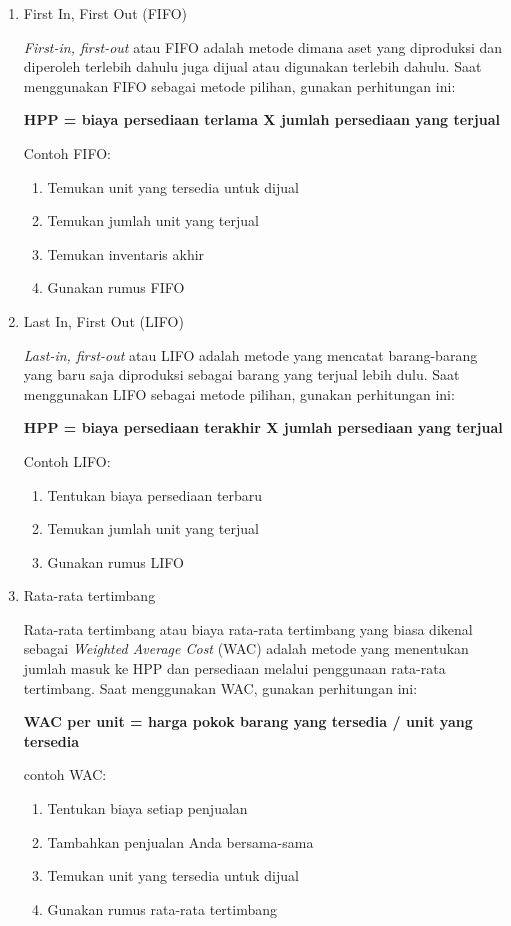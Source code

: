 \begin{enumerate}
	\item First In, First Out (FIFO)
	
	\textit{First-in, first-out} atau FIFO adalah metode dimana aset yang diproduksi dan diperoleh terlebih dahulu juga dijual atau digunakan terlebih dahulu. Saat menggunakan FIFO sebagai metode pilihan, gunakan perhitungan ini:
	
	
	\textbf{HPP = biaya persediaan terlama X jumlah persediaan yang terjual}

	Contoh FIFO:
	\begin{enumerate}
		\item Temukan unit yang tersedia untuk dijual
		\item Temukan jumlah unit yang terjual
		\item Temukan inventaris akhir
		\item Gunakan rumus FIFO
	\end{enumerate}

	\item Last In, First Out (LIFO)
	
	\textit{Last-in, first-out} atau LIFO adalah metode yang mencatat barang-barang yang baru saja diproduksi sebagai barang yang terjual lebih dulu. Saat menggunakan LIFO sebagai metode pilihan, gunakan perhitungan ini:


	\textbf{HPP = biaya persediaan terakhir X jumlah persediaan yang terjual}

	Contoh LIFO:
	\begin{enumerate}
		\item Tentukan biaya persediaan terbaru
		\item Temukan jumlah unit yang terjual
		\item Gunakan rumus LIFO
	\end{enumerate}

	\item Rata-rata tertimbang
	
	Rata-rata tertimbang atau biaya rata-rata tertimbang yang biasa dikenal sebagai \textit{Weighted Average Cost} (WAC) adalah metode yang menentukan jumlah masuk ke HPP dan persediaan melalui penggunaan rata-rata tertimbang. Saat menggunakan WAC, gunakan perhitungan ini:


	\textbf{WAC per unit = harga pokok barang yang tersedia / unit yang tersedia}

	contoh WAC:
	\begin{enumerate}
		\item Tentukan biaya setiap penjualan
		\item Tambahkan penjualan Anda bersama-sama
		\item Temukan unit yang tersedia untuk dijual
		\item Gunakan rumus rata-rata tertimbang
	\end{enumerate}

\end{enumerate}

